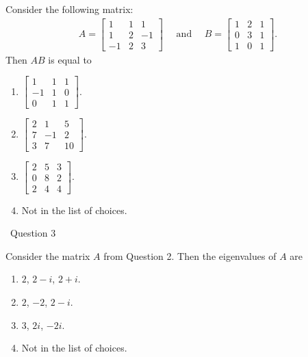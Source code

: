 \documentclass[12pt]{article}
\newcommand{\spc}{\vspace*{0.5cm}}
\newcommand{\ques}[1]{\noindent\hrulefill \, Question #1 \, \hrulefill}
\begin{document}
	Consider the following matrix:
		\begin{align*}
		A = \begin{bmatrix} 1 & 1 & 1 \\ 1 & 2 & -1 \\ -1 & 2 & 3 \end{bmatrix} \quad \text{ and } \quad B = \begin{bmatrix} 1 & 2 & 1 \\ 0 & 3 & 1 \\ 1 & 0 & 1 \end{bmatrix} .
		\end{align*}
	Then $AB$ is equal to
		\begin{multicols}{2}
		\begin{enumerate}[label=\alph*)]
		\item $\begin{bmatrix} 1 & 1 & 1 \\ -1 & 1 & 0 \\ 0 & 1 & 1 \end{bmatrix}$.
		\item $\begin{bmatrix}
		2 & 1 & 5 \\ 7 & -1 & 2 \\ 3 & 7 & 10
		\end{bmatrix}$.
		\item $\begin{bmatrix}
		2 & 5 & 3 \\
		0 & 8 & 2 \\
		2 & 4 & 4
		\end{bmatrix}.$
		\item Not in the list of choices.
		\end{enumerate}
		\end{multicols}
		
	\spc
	
	\ques{3}
	
	Consider the matrix $A$ from Question 2. Then the eigenvalues of $A$ are
		\begin{multicols}{2}
		\begin{enumerate}[label=\alph*)]
		\item $2$, $2 - i$, $2 + i$.
		\item $2$, $-2$, $2- i$.
		\item $3$, $2i$, $-2i$.
		\item Not in the list of choices.
		\end{enumerate}
		\end{multicols}
		
\end{document}
